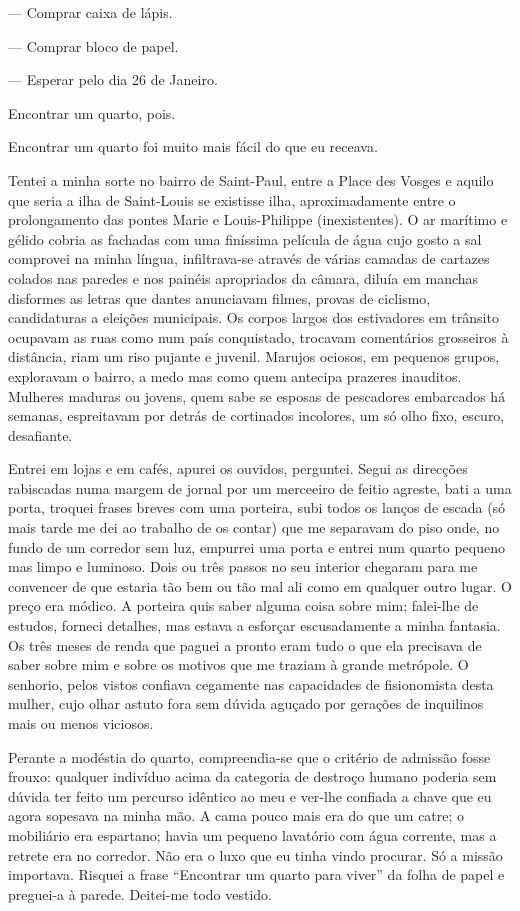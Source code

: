 --- Comprar caixa de lápis.

--- Comprar bloco de papel.

--- Esperar pelo dia 26 de Janeiro.


Encontrar um quarto, pois.

Encontrar um quarto foi muito mais fácil do que eu receava.

Tentei a minha sorte no bairro de Saint-Paul, entre a Place des Vosges e
aquilo que seria a ilha de Saint-Louis se existisse ilha,
aproximadamente entre o prolongamento das pontes Marie e Louis-Philippe
(inexistentes). O ar marítimo e gélido cobria as fachadas com uma
finíssima película de água cujo gosto a sal comprovei na minha língua,
infiltrava-se através de várias camadas de cartazes colados nas paredes
e nos painéis apropriados da câmara, diluía em manchas disformes as
letras que dantes anunciavam filmes, provas de ciclismo, candidaturas
a eleições municipais. Os corpos largos dos estivadores em trânsito
ocupavam as ruas como num país conquistado, trocavam comentários
grosseiros à distância, riam um riso pujante e juvenil. Marujos ociosos,
em pequenos grupos, exploravam o bairro, a medo mas como quem antecipa
prazeres inauditos. Mulheres maduras ou jovens, quem sabe se esposas
de pescadores embarcados há semanas, espreitavam por detrás de
cortinados incolores, um só olho fixo, escuro, desafiante.

Entrei em lojas e em cafés, apurei os ouvidos, perguntei. Segui as
direcções rabiscadas numa margem de jornal por um merceeiro de feitio
agreste, bati a uma porta, troquei frases breves com uma porteira, subi
todos os lanços de escada (só mais tarde me dei ao trabalho de os
contar) que me separavam do piso onde, no fundo de um corredor sem luz,
empurrei uma porta e entrei num quarto pequeno mas limpo e luminoso.
Dois ou três passos no seu interior chegaram para me convencer de que
estaria tão bem ou tão mal ali como em qualquer outro lugar. O preço era
módico. A porteira quis saber alguma coisa sobre mim; falei-lhe de
estudos, forneci detalhes, mas estava a esforçar escusadamente a minha
fantasia. Os três meses de renda que paguei a pronto eram tudo o que
ela precisava de saber sobre mim e sobre os motivos que me traziam à
grande metrópole. O senhorio, pelos vistos confiava cegamente nas
capacidades de fisionomista desta mulher, cujo olhar astuto fora sem
dúvida aguçado por gerações de inquilinos mais ou menos viciosos.

Perante a modéstia do quarto, compreendia-se que o critério de admissão
fosse frouxo: qualquer indivíduo acima da categoria de destroço humano
poderia sem dúvida ter feito um percurso idêntico ao meu e ver-lhe
confiada a chave que eu agora sopesava na minha mão. A cama pouco mais
era do
que um catre; o mobiliário era espartano; havia um pequeno lavatório com
água corrente, mas a retrete era no corredor. Não era o luxo que eu
tinha vindo procurar. Só a missão importava. Risquei a frase
``Encontrar um quarto para viver'' da folha de papel e preguei-a à
parede. Deitei-me todo vestido.

